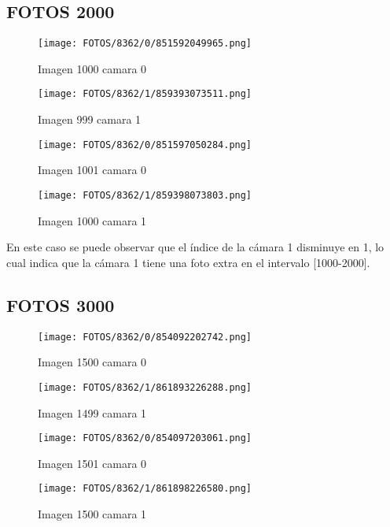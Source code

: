 \documentclass{article}
\begin{document}
\subsection{FOTOS 2000}

\begin{figure}[H]
  \centering
  \begin{minipage}[b]{0.45\textwidth}
    \centering
    \texttt{[image: FOTOS/8362/0/851592049965.png]}
    \caption{Imagen 1000 camara 0}
  \end{minipage}
  \begin{minipage}[b]{0.45\textwidth}
    \centering
    \texttt{[image: FOTOS/8362/1/859393073511.png]}
    \caption{Imagen 999 camara 1}
  \end{minipage}
  \begin{minipage}[b]{0.45\textwidth}
    \centering
    \texttt{[image: FOTOS/8362/0/851597050284.png]}
    \caption{Imagen 1001 camara 0}
  \end{minipage}
  \begin{minipage}[b]{0.45\textwidth}
    \centering
    \texttt{[image: FOTOS/8362/1/859398073803.png]}
    \caption{Imagen 1000 camara 1}
  \end{minipage}
\end{figure}

\noindent En este caso se puede observar que el índice de la cámara 1 disminuye en 1, lo cual indica que la cámara 1 tiene una foto extra en el intervalo [1000-2000].

\subsection{FOTOS 3000}

\begin{figure}[H]
  \centering
  \begin{minipage}[b]{0.45\textwidth}
    \centering
    \texttt{[image: FOTOS/8362/0/854092202742.png]}
    \caption{Imagen 1500 camara 0}
  \end{minipage}
  \begin{minipage}[b]{0.45\textwidth}
    \centering
    \texttt{[image: FOTOS/8362/1/861893226288.png]}
    \caption{Imagen 1499 camara 1}
  \end{minipage}
  \begin{minipage}[b]{0.45\textwidth}
    \centering
    \texttt{[image: FOTOS/8362/0/854097203061.png]}
    \caption{Imagen 1501 camara 0}
  \end{minipage}
  \begin{minipage}[b]{0.45\textwidth}
    \centering
    \texttt{[image: FOTOS/8362/1/861898226580.png]}
    \caption{Imagen 1500 camara 1}
  \end{minipage}
\end{figure}
\end{document}
